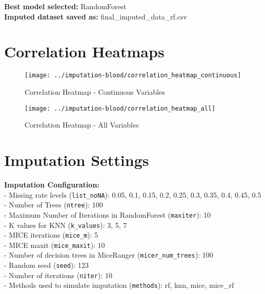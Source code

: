 \documentclass[
]{article}
\begin{document}
\textbf{Best model selected: }RandomForest\\
\textbf{Imputed dataset saved as: }final\_imputed\_data\_rf.csv

\section{Correlation Heatmaps}\label{correlation-heatmaps}

\begin{figure}[H]

{\centering \texttt{[image: ../imputation-blood/correlation\_heatmap\_continuous]} 

}

\caption{Correlation Heatmap - Continuous Variables}\label{fig:show-cor-cont}
\end{figure}

\begin{figure}[H]

{\centering \texttt{[image: ../imputation-blood/correlation\_heatmap\_all]} 

}

\caption{Correlation Heatmap - All Variables}\label{fig:show-cor-all}
\end{figure}

\section{Imputation Settings}\label{imputation-settings}

\textbf{Imputation Configuration:}\\
- Missing rate levels (\texttt{list\_noNA}): 0.05, 0.1, 0.15, 0.2, 0.25,
0.3, 0.35, 0.4, 0.45, 0.5\\
- Number of Trees (\texttt{ntree}): 100\\
- Maximum Number of Iterations in RandomForest (\texttt{maxiter}): 10\\
- K values for KNN (\texttt{k\_values}): 3, 5, 7\\
- MICE iterations (\texttt{mice\_m}): 5\\
- MICE maxit (\texttt{mice\_maxit}): 10\\
- Number of decision trees in MiceRanger (\texttt{micer\_num\_trees}):
100\\
- Random seed (\texttt{seed}): 123\\
- Number of iterations (\texttt{niter}): 10\\
- Methods used to simulate imputation (\texttt{methods}): rf, knn, mice,
mice\_rf
\end{document}
